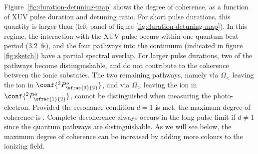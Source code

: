 Figure~\ref{fig:duration-detuning-map} shows the degree of coherence,
as a function of XUV pulse duration and detuning ratio. For short
pulse durations, this quantity is larger than  (left panel
of figure \ref{fig:duration-detuning-map}). In this regime, the
interaction with the XUV pulse occurs within one quantum beat period
(\SI{3.2}{\femto\second}), and the four pathways into the continuum
(indicated in figure \ref{fig:sketch}) have a partial spectral
overlap. For larger pulse durations, two of the pathways become
distinguishable, and do not contribute to the coherence between the
ionic substates. The two remaining pathways, namely via \(\Omega_<\)
leaving the ion in \(\conf{^2P^{o}_{\sfrac{3}{2}}}\), and via
\(\Omega_>\) leaving the ion in \(\conf{^2P^{o}_{\sfrac{1}{2}}}\), cannot
be distinguished when measuring the photo-electron. Provided the
resonance condition \(d=1\) is met, the maximum degree of coherence is
. Complete decoherence always occurs in the long-pulse
limit if \(d\neq1\) since the quantum pathways are distinguishable. As we
will see below, the maximum degree of coherence can be increased by
adding more colours to the ionizing field.
